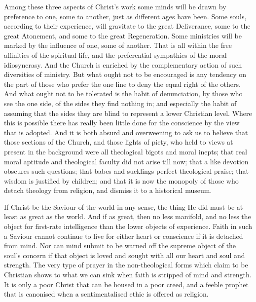 \documentclass[draft]{ptfdoc}
\begin{document}
Among these three aspects of Christ's work 
some minds will be drawn by preference to 
one, some to another, just as different ages 
have been. Some souls, according to their experience, 
will gravitate to the great Deliverance, 
some to the great Atonement, and some to the 
great Regeneration. Some ministries will be 
marked by the influence of one, some of 
another. That is all within the free affinities 
of the spiritual life, and the preferential sympathies 
of the moral idiosyncrasy. And the 
Church is enriched by the complementary 
action of such diversities of ministry. But 
what ought not to be encouraged is any tendency 
on the part of those who prefer the 
one line to deny the equal right of the others. 
And what ought not to be tolerated is the 
habit of denunciation, by those who see the 
one side, of the sides they find nothing in; and 
especially the habit of assuming that the sides 
they are blind to represent a lower Christian 
level. Where this is possible there has really 
been little done for the conscience by the view 
that is adopted. And it is both absurd and overweening 
to ask us to believe that those sections 
of the Church, and those lights of piety, who 
held to views at present in the background were 
all theological bigots and moral inepts; that 
real moral aptitude and theological faculty did 
not arise till now; that a like devotion obscures 
such questions; that babes and sucklings perfect 
theological praise; that wisdom is justified 
by children; and that it is now the monopoly 
of those who detach theology from religion, and 
dismiss it to a historical museum. 

If Christ be the Saviour of the world in 
any sense, the thing He did must be at least as 
great as the world. And if as great, then no 
less manifold, and no less the object for first-rate 
intelligence than the lower objects of 
experience. Faith in such a Saviour cannot 
continue to live for either heart or conscience 
if it is detached from mind. Nor can mind 
submit to be warned off the supreme object of 
the soul's concern if that object is loved and 
sought with all our heart and soul and 
strength. The very type of prayer in the 
non-theological forms which claim to be Christian 
shows to what we can sink when faith is 
stripped of mind and strength. It is only a poor 
Christ that can be housed in a poor creed, and 
a feeble prophet that is canonised when a 
sentimentalised ethic is offered as religion. 
\end{document}

